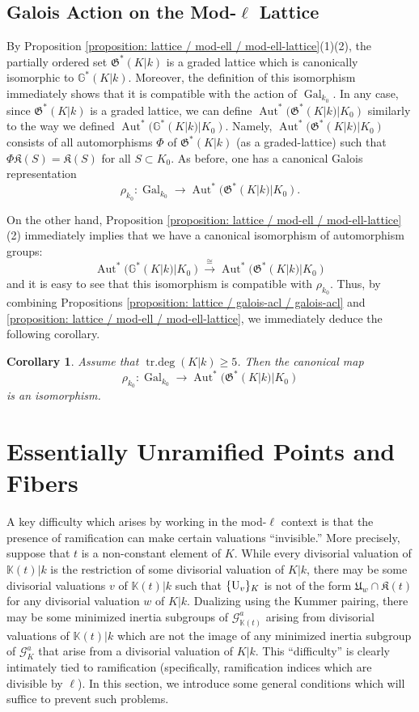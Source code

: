 \documentclass[11pt]{amsart}
\newtheorem{corollary}[proposition]{Corollary}
\theoremstyle{definition}
\theoremstyle{remark}
\numberwithin{equation}{section}
\DeclareMathOperator{\Aut}{Aut}
\DeclareMathOperator{\Gal}{Gal}
\DeclareMathOperator{\trdeg}{tr.deg}
\newcommand{\G}{\mathbb{G}}
\newcommand{\U}{{\rm U}}
\newcommand{\Gbb}{\mathbb{G}}
\newcommand{\Kbb}{\mathbb{K}}
\newcommand{\Gc}{\mathcal{G}}
\newcommand{\Kfrak}{\mathfrak{K}}
\newcommand{\Gfrak}{\mathfrak{G}}
\newcommand{\Ufrak}{\mathfrak{U}}
\newcommand{\Galk}{{\Gal_{k_0}}}
\begin{document}
\subsection{Galois Action on the Mod-$\ell$ Lattice}
\label{subsection: lattice / galois-mod-ell}

By Proposition \ref{proposition: lattice / mod-ell / mod-ell-lattice}(1)(2), the partially ordered set $\Gfrak^*(K|k)$ is a graded lattice which is canonically isomorphic to $\Gbb^*(K|k)$.
Moreover, the definition of this isomorphism immediately shows that it is compatible with the action of $\Galk$.
In any case, since $\Gfrak^*(K|k)$ is a graded lattice, we can define $\Aut^*(\Gfrak^*(K|k)|K_0)$ similarly to the way we defined $\Aut^*(\G^*(K|k)|K_0)$.
Namely, $\Aut^*(\Gfrak^*(K|k)|K_0)$ consists of all automorphisms $\Phi$ of $\Gfrak^*(K|k)$ (as a graded-lattice) such that $\Phi\Kfrak(S) = \Kfrak(S)$ for all $S \subset K_0$.
As before, one has a canonical Galois representation 
\[ \rho_{k_0} : \Galk \rightarrow \Aut^*(\Gfrak^*(K|k)|K_0). \]

On the other hand, Proposition \ref{proposition: lattice / mod-ell / mod-ell-lattice}(2) immediately implies that we have a canonical isomorphism of automorphism groups:
\[ \Aut^*(\Gbb^*(K|k)|K_0) \xrightarrow{\cong} \Aut^*(\Gfrak^*(K|k)|K_0) \]
and it is easy to see that this isomorphism is compatible with $\rho_{k_0}$.
Thus, by combining Propositions \ref{proposition: lattice / galois-acl / galois-acl} and \ref{proposition: lattice / mod-ell / mod-ell-lattice}, we immediately deduce the following corollary.

\begin{corollary}
\label{corollary: lattice / galois-mod-ell / galois-lattice-iso}
  Assume that $\trdeg(K|k) \geq 5$.
  Then the canonical map
  \[ \rho_{k_0} : \Galk \rightarrow \Aut^*(\Gfrak^*(K|k)|K_0) \]
  is an isomorphism.
\end{corollary}


\section{Essentially Unramified Points and Fibers}
\label{section: essram}


A key difficulty which arises by working in the mod-$\ell$ context is that the presence of ramification can make certain valuations ``invisible.''
More precisely, suppose that $t$ is a non-constant element of $K$.
While every divisorial valuation of $\Kbb(t)|k$ is the restriction of some divisorial valuation of $K|k$, there may be some divisorial valuations $v$ of $\Kbb(t)|k$ such that $\{\U_v\}_K$ is not of the form $\Ufrak_w \cap \Kfrak(t)$ for any divisorial valuation $w$ of $K|k$.
Dualizing using the Kummer pairing, there may be some minimized inertia subgroups of $\Gc_{\Kbb(t)}^a$ arising from divisorial valuations of $\Kbb(t)|k$ which are not the image of any minimized inertia subgroup of $\Gc_K^a$ that arise from a divisorial valuation of $K|k$.
This ``difficulty'' is clearly intimately tied to ramification (specifically, ramification indices which are divisible by $\ell$).
In this section, we introduce some general conditions which will suffice to prevent such problems.
\end{document}
